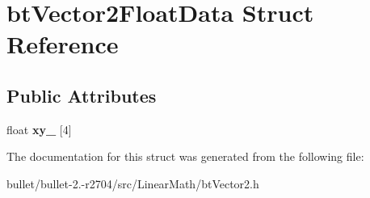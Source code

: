 \hypertarget{structbt_vector2_float_data}{\section{bt\+Vector2\+Float\+Data Struct Reference}
\label{structbt_vector2_float_data}
}
\subsection*{Public Attributes}
\begin{DoxyCompactItemize}
\item 
\hypertarget{structbt_vector2_float_data_a7c44857afca2b4b610090614c16d170a}{float {\bfseries xy\+\_\+} \mbox{[}4\mbox{]}}\label{structbt_vector2_float_data_a7c44857afca2b4b610090614c16d170a}

\end{DoxyCompactItemize}


The documentation for this struct was generated from the following file\+:\begin{DoxyCompactItemize}
\item 
bullet/bullet-\/2.-\/r2704/src/\+Linear\+Math/bt\+Vector2.\+h\end{DoxyCompactItemize}
